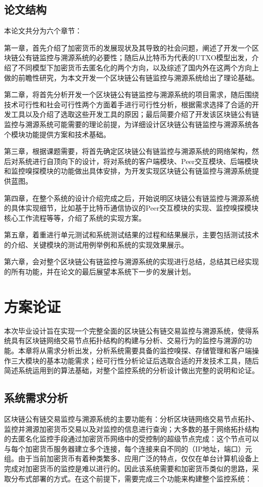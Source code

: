 \documentclass[supercite]{HustGraduPaper}
\newcommand{\xfig}[3]{
  \begin{figure}[htb]
    \centering
    #3
    \caption{#2}
    \label{fig:#1}
  \end{figure}
}
\theoremstyle{definition}
\begin{document}
\subsection{论文结构}

本论文共分为六个章节：

第一章，首先介绍了加密货币的发展现状及其导致的社会问题，阐述了开发一个区块链公有链监控与溯源系统的必要性；随后从比特币为代表的UTXO模型出发，介绍了不同模型下加密货币去匿名化的两个方向，以及综述了国内外在这两个方向上做的前瞻性研究，为本文开发一个区块链公有链监控与溯源系统给出了理论基础。

第二章，将首先分析开发一个区块链公有链监控与溯源系统的项目需求，随后围绕技术可行性和社会可行性两个方面着手进行可行性分析，根据需求选择了合适的开发工具以及介绍了选取这些开发工具的原因；最后简要介绍了开发该区块链公有链监控与溯源系统可能需要的理论前提，为详细设计区块链公有链监控与溯源系统各个模块功能提供方案和技术基础。

第三章，根据课题需要，将首先确定区块链公有链监控与溯源系统的网络架构，然后对系统进行自顶向下的设计，将对系统的客户端模块、Peer交互模块、后端模块和监控嗅探模块的功能做出具体安排，为开发实现区块链公有链监控与溯源系统提供蓝图。

第四章，在整个系统的设计介绍完成之后，开始说明区块链公有链监控与溯源系统的具体实现细节，比如基于比特币通信协议的Peer交互模块的实现、监控嗅探模块核心工作流程等等，介绍了系统的实现方案。

第五章，着重进行单元测试和系统测试结果的过程和结果展示，主要包括测试技术的介绍、关键模块的测试用例举例和系统的实现效果展示。

第六章，会对整个区块链公有链监控与溯源系统的实现进行总结，总结其已经实现的所有功能，并在论文的最后展望本系统下一步的发展计划。

\newpage
\section{方案论证}
本次毕业设计旨在实现一个完整全面的区块链公有链交易监控与溯源系统，使得系统具有区块链网络交易节点拓扑结构的构建与分析、交易行为的监控与溯源的功能。本章将从需求分析出发，分析系统需要具备的监控嗅探、存储管理和客户端操作三大模块的基本功能需求；经可行性分析论证后选取合适的开发技术工具，随后简述系统运用到的算法基础，对整个监控系统的分析设计做出完整的说明和论证。
\subsection{系统需求分析}\label{sec:demands}
区块链公有链交易监控与溯源系统的主要功能有：分析区块链网络交易节点拓扑、监控并溯源加密货币交易以及对监控的信息进行查询；大多数的基于网络拓扑结构的去匿名化监控手段通过加密货币网络中的受控制的超级节点完成：这个节点可以与每个加密货币服务器建立多个连接，每个连接来自不同的（IP地址，端口）元组。由于当前加密货币有着种类繁多、应用广泛的特点，仅仅在单台计算机设备上完成对加密货币的监控是难以进行的。因此该系统需要和加密货币类似的思路，采取分布式部署的方式。在这个前提下，需要完成三个功能来构建整个监控系统：
\end{document}
